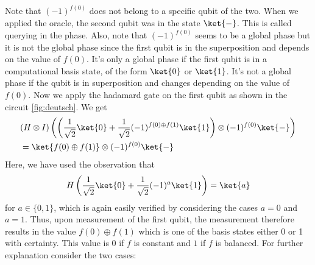 \documentclass[12pt, oneside]{book}
\theoremstyle{definition}
\theoremstyle{definition}
\theoremstyle{remark}
\begin{document}
Note that $(-1)^{f(0)}$ does not belong to a specific qubit of the two. When we applied the oracle, the second qubit was in the state $\ket{-}$. This is called querying in the phase. Also, note that $(-1)^{f(0)}$ seems to be a global phase but it is not the global phase since the first qubit is in the superposition and depends on the value of $f(0)$. It's only a global phase if the first qubit is in a computational basis state, of the form $\ket{0}$ or $\ket{1}$. It's not a global phase if the qubit is in superposition and changes depending on the value of $f(0)$.
Now we apply the hadamard gate on the first qubit as shown in the circuit \ref{fig:deutsch}. We get
\begin{align*}
&(H\otimes I)\left(\left(\frac{1}{\sqrt{2}}\ket{0}+\frac{1}{\sqrt{2}}(-1)^{f(0)\oplus f(1)}\ket{1}\right)\otimes (-1)^{f(0)}\ket{-}\right)\\
&=\ket{f(0)\oplus f(1)} \otimes (-1)^{f(0)}\ket{-}
\end{align*}
Here, we have used the observation that
\[
H\left(\frac{1}{\sqrt{2}}\ket{0}+\frac{1}{\sqrt{2}}(-1)^a\ket{1}\right)=\ket{a}
\]
for $a \in \{0,1\}$, which is again easily verified by considering the cases $a=0$ and $a=1$. Thus, upon measurement of the first qubit, the measurement therefore results in the value $f(0) \oplus f(1)$ which is one of the basis states either 0 or 1 with certainty. This value is $0$ if $f$ is constant and $1$ if $f$ is balanced.
For further explanation consider the two cases:
\end{document}
